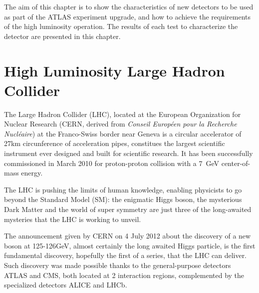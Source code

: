 The aim of this chapter is to show the characteristics of new detectors to be used as part of the ATLAS experiment
upgrade,
and how to achieve the requirements of the high luminosity operation.
The results of each test to characterize the detector are presented in this chapter.


\section{High Luminosity Large Hadron Collider}

The Large Hadron Collider (LHC), located at the European Organization for Nuclear Research (CERN, derived from {\it Conseil
Europ\'een pour la Recherche Nucl\'eaire}) at the Franco-Swiss border near Geneva is a circular accelerator of 27km
circunference of
acceleration pipes, constitues the largest scientific instrument ever designed and built for scientific research.  It has been
successfully commissioned in March 2010 for proton-proton collision with a \SI{7}{GeV} center-of-mass energy.\par

The LHC is pushing the limits of human knowledge, enabling physicists to go beyond the Standard Model (SM): the
enigmatic Higgs boson, the mysterious Dark Matter and the world of super symmetry are just three of the long-awaited
mysteries that the LHC is working to unveil. \par

The announcement given by CERN on 4 July 2012 about the discovery of a new boson at 125-126GeV\cite{atlas,cms}, almost
certainly the long awaited Higgs particle, is the first fundamental discovery, hopefully the first of a series, that the
LHC can deliver.\\ Such discovery was made possible thanks to the general-purpose detectors ATLAS and CMS, both located
at 2 interaction regions, complemented by the specialized detectors ALICE and LHCb.




